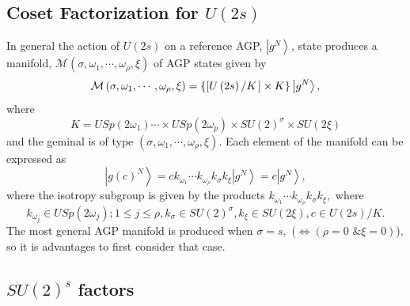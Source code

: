 \documentclass[12pt,aps,amsfonts,amssymb,tightenlines]{revtex4}%
\begin{document}
\subsection{Coset Factorization for $U\left(  2s\right)  $\label{factor}}

In general the action of $U\left(  2s\right)  $ on a reference AGP,
$\left\vert g^{N}\right\rangle $, state produces a manifold, $\mathcal{M}%
\left(  \sigma,\omega_{1},\cdots,\omega_{\rho},\xi\right)  $ of AGP states
given by
\begin{equation}
\mathcal{M}\left(  \sigma,\omega_{1},\cdots,\omega_{\rho},\xi\right)
=\left\{  \left[  U\left(  2s\right)  \left/  K\overset{}{}\right.  \right]
\times K\right\}  \left\vert g^{N}\right\rangle , \label{su2act}%
\end{equation}
where
\begin{equation}
K=USp\left(  2\omega_{1}\right)  \cdots\times USp\left(  2\omega_{p}\right)
\times SU\left(  2\right)  ^{\sigma}\times SU\left(  2\xi\right)
\end{equation}
and the geminal is of type $\left(  \sigma,\omega_{1},\cdots,\omega_{\rho}%
,\xi\right)  $. Each element of the manifold can be expressed as
\begin{equation}
\left\vert g\left(  c\right)  ^{N}\right\rangle =ck_{\omega_{1}}\cdots
k_{\omega_{\rho}}k_{\sigma}k_{\xi}\left\vert g^{N}\right\rangle =c\left\vert
g^{N}\right\rangle ,
\end{equation}
where the isotropy subgroup is given by the products $k_{\omega_{1}}\cdots
k_{\omega_{\rho}}k_{\sigma}k_{\xi},$ where%
\begin{equation}
k_{\omega_{j}}\in USp\left(  2\omega_{j}\right)  ;1\leq j\leq\rho,k_{\sigma
}\in SU\left(  2\right)  ^{\sigma},k_{\xi}\in SU\left(  2\xi\right)  ,c\in
U\left(  2s\right)  /K.
\end{equation}
The most general AGP manifold is produced when $\sigma=s,$ ($\Leftrightarrow
\left(  \rho=0\text{ \& }\xi=0\right)  $), so it is advantages to first
consider that case.

\subsection{$SU\left(  2\right)  ^{s}$ factors}
\end{document}
